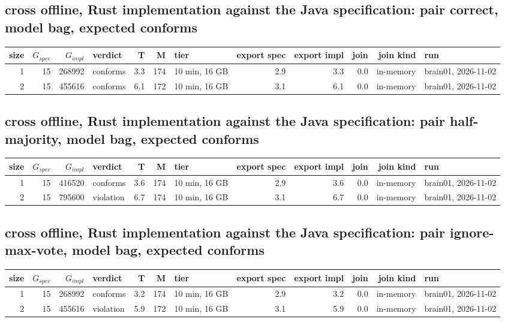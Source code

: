 \documentclass[10pt]{article}
\begin{document}
\subsection*{cross offline, Rust implementation against the Java specification: pair \textsf{correct}, model bag, expected conforms}
\begin{longtable}{@{}rrrlrrlrrrrl@{}}
\toprule
size & $G_{\mathit{spec}}$ & $G_{\mathit{impl}}$ & verdict & T & M & tier & export spec & export impl & join & join kind & run \\
\midrule
\endhead
\color{red} 1 & 15 & 268992 & conforms & 3.3 & 174 & 10 min, 16 GB & 2.9 & 3.3 & 0.0 & in-memory & brain01, 2026-11-02 \\
\color{red} 2 & 15 & 455616 & conforms & 6.1 & 172 & 10 min, 16 GB & 3.1 & 6.1 & 0.0 & in-memory & brain01, 2026-11-02 \\
\bottomrule
\end{longtable}
\subsection*{cross offline, Rust implementation against the Java specification: pair \textsf{half-majority}, model bag, expected conforms}
\begin{longtable}{@{}rrrlrrlrrrrl@{}}
\toprule
size & $G_{\mathit{spec}}$ & $G_{\mathit{impl}}$ & verdict & T & M & tier & export spec & export impl & join & join kind & run \\
\midrule
\endhead
\color{red} 1 & 15 & 416520 & conforms & 3.6 & 174 & 10 min, 16 GB & 2.9 & 3.6 & 0.0 & in-memory & brain01, 2026-11-02 \\
\color{red} 2 & 15 & 795600 & violation & 6.7 & 174 & 10 min, 16 GB & 3.1 & 6.7 & 0.0 & in-memory & brain01, 2026-11-02 \\
\bottomrule
\end{longtable}
\subsection*{cross offline, Rust implementation against the Java specification: pair \textsf{ignore-max-vote}, model bag, expected conforms}
\begin{longtable}{@{}rrrlrrlrrrrl@{}}
\toprule
size & $G_{\mathit{spec}}$ & $G_{\mathit{impl}}$ & verdict & T & M & tier & export spec & export impl & join & join kind & run \\
\midrule
\endhead
\color{red} 1 & 15 & 268992 & conforms & 3.2 & 174 & 10 min, 16 GB & 2.9 & 3.2 & 0.0 & in-memory & brain01, 2026-11-02 \\
\color{red} 2 & 15 & 455616 & violation & 5.9 & 172 & 10 min, 16 GB & 3.1 & 5.9 & 0.0 & in-memory & brain01, 2026-11-02 \\
\bottomrule
\end{longtable}
\end{document}
